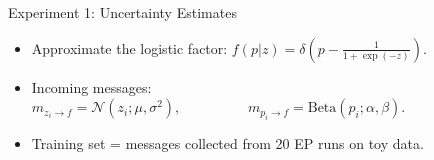\documentclass[english]{beamer}
\newcommand{\factor}{f}				%
\newcommand{\msg}[2]{m_{#1 \rightarrow #2}}			%
\begin{document}
\begin{frame}
\begin{columns}[t]
\begin{block}{ Experiment 1: Uncertainty Estimates}
\begin{itemize}

\item Approximate the logistic factor: 
    $f(p|z) = \delta\left(p-\frac{1}{1+\exp(-z)}\right)$. 
\item Incoming messages: 
    $\msg{z_i}{\factor} = \mathcal{N}(z_i; \mu, \sigma^2), \hspace{2cm}
    \msg{p_i}{\factor} = \text{Beta}(p_i; \alpha, \beta). $
\item Training set = messages collected from 20 EP runs on toy data.


\end{itemize}
\end{block}
\end{columns}
\end{frame}
\end{document}
